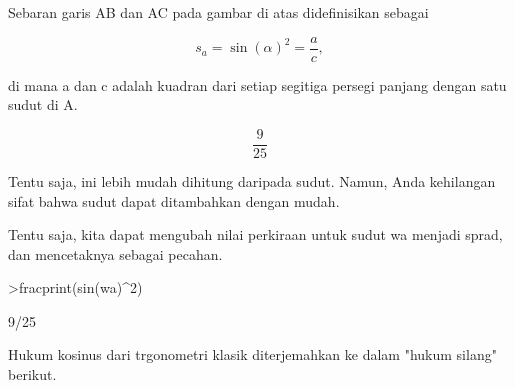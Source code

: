 \documentclass[a4paper,10pt]{article}
\begin{document}
\begin{eulernotebook}
\begin{eulercomment}
\begin{eulercomment}
\begin{eulercomment}
\begin{eulercomment}
\begin{eulercomment}
\begin{eulercomment}
\begin{eulercomment}
\begin{eulercomment}
\begin{eulercomment}
\begin{eulercomment}
\begin{eulercomment}
\begin{eulercomment}
\begin{eulercomment}
\begin{eulercomment}
\begin{eulercomment}
\begin{eulercomment}
\begin{eulercomment}
\begin{eulercomment}
\begin{eulercomment}
\begin{eulercomment}
\begin{eulercomment}
\begin{eulercomment}
\begin{eulercomment}
\begin{eulercomment}
\begin{eulercomment}
\begin{eulercomment}
\begin{eulercomment}
\begin{eulercomment}
\begin{eulercomment}
\begin{eulercomment}
\begin{eulercomment}
\begin{eulercomment}
\begin{eulercomment}
Sebaran garis AB dan AC pada gambar di atas didefinisikan sebagai

\end{eulercomment}
\begin{eulerformula}
\[
s_a = \sin(\alpha)^2 = \frac{a}{c},
\]
\end{eulerformula}
\begin{eulercomment}
di mana a dan c adalah kuadran dari setiap segitiga persegi panjang
dengan satu sudut di A.
\end{eulercomment}
\begin{eulerformula}
\[
\frac{9}{25}
\]
\end{eulerformula}
\begin{eulercomment}
Tentu saja, ini lebih mudah dihitung daripada sudut. Namun, Anda
kehilangan sifat bahwa sudut dapat ditambahkan dengan mudah.

Tentu saja, kita dapat mengubah nilai perkiraan untuk sudut wa menjadi
sprad, dan mencetaknya sebagai pecahan.
\end{eulercomment}
\begin{eulerprompt}
>fracprint(sin(wa)^2)
\end{eulerprompt}
\begin{euleroutput}
  9/25
\end{euleroutput}
\begin{eulercomment}
Hukum kosinus dari trgonometri klasik diterjemahkan ke dalam "hukum
silang" berikut.


\end{eulercomment}
\end{eulercomment}
\end{eulercomment}
\end{eulercomment}
\end{eulercomment}
\end{eulercomment}
\end{eulercomment}
\end{eulercomment}
\end{eulercomment}
\end{eulercomment}
\end{eulercomment}
\end{eulercomment}
\end{eulercomment}
\end{eulercomment}
\end{eulercomment}
\end{eulercomment}
\end{eulercomment}
\end{eulercomment}
\end{eulercomment}
\end{eulercomment}
\end{eulercomment}
\end{eulercomment}
\end{eulercomment}
\end{eulercomment}
\end{eulercomment}
\end{eulercomment}
\end{eulercomment}
\end{eulercomment}
\end{eulercomment}
\end{eulercomment}
\end{eulercomment}
\end{eulercomment}
\end{eulercomment}
\end{eulernotebook}
\end{document}
